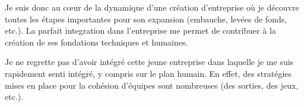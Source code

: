 Je suis donc au cœur de la dynamique d'une création d'entreprise où je découvre
toutes les étapes importantes pour son expansion (embauche, levées de fonds,
etc.). La parfait integration dans l'entreprise me permet de contribuer à la
création de ses fondations techniques et humaines.

Je ne regrette pas d'avoir intégré cette jeune entreprise dans laquelle je
me suis rapidement senti intégré, y compris sur le plan humain. En effet,
des stratégies mises en place pour la cohésion d'équipes sont nombreuses (des
sorties, des jeux, etc.).
